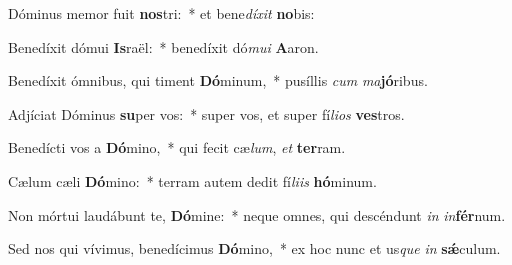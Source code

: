 \item Dóminus memor fuit \textbf{nos}tri:~* et bene\textit{dí}\textit{xit} \textbf{no}bis:
\item Benedíxit dómui \textbf{Is}raël:~* benedíxit dó\textit{mu}\textit{i} \textbf{A}aron.
\item Benedíxit ómnibus, qui timent \textbf{Dó}minum,~* pusíllis \textit{cum} \textit{ma}\textbf{jó}ribus.
\item Adjíciat Dóminus \textbf{su}per vos:~* super vos, et super fí\textit{li}\textit{os} \textbf{ves}tros.
\item Benedícti vos a \textbf{Dó}mino,~* qui fecit cæ\textit{lum}, \textit{et} \textbf{ter}ram.
\item Cælum cæli \textbf{Dó}mino:~* terram autem dedit fí\textit{li}\textit{is} \textbf{hó}minum.
\item Non mórtui laudábunt te, \textbf{Dó}mine:~* neque omnes, qui descéndunt \textit{in} \textit{in}\textbf{fér}num.
\item Sed nos qui vívimus, benedícimus \textbf{Dó}mino,~* ex hoc nunc et us\textit{que} \textit{in} \textbf{sǽ}culum.
